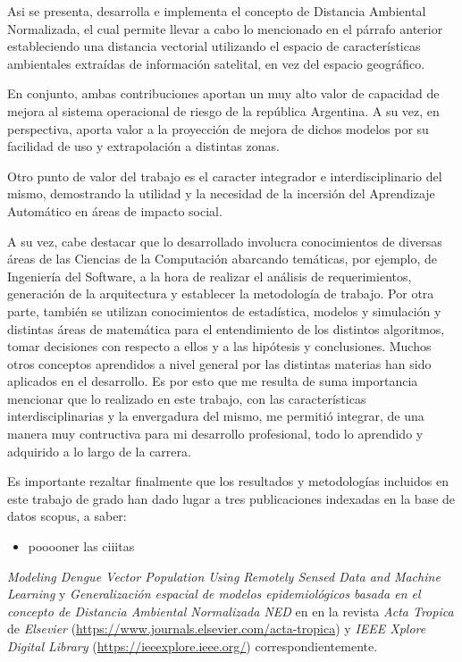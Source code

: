   \par Asi se presenta, desarrolla e implementa el concepto de Distancia Ambiental
    Normalizada, el cual permite
    llevar a cabo lo mencionado en el párrafo anterior estableciendo una distancia
    vectorial utilizando el espacio de características ambientales extraídas de
    información satelital, en vez del espacio geográfico.

  \par En conjunto, ambas contribuciones aportan un muy alto valor de capacidad de
    mejora al sistema operacional de riesgo de la república Argentina. A su vez,
    en perspectiva, aporta valor a la proyección de mejora de dichos modelos por
    su facilidad de uso y extrapolación a distintas zonas.

  \par Otro punto de valor del trabajo es el caracter integrador e
    interdisciplinario del mismo, demostrando la utilidad y la necesidad
    de la incersión del Aprendizaje Automático en áreas de impacto social.

  \par A su vez, cabe destacar que lo desarrollado involucra conocimientos de
  diversas áreas de las Ciencias de la Computación abarcando temáticas, por ejemplo, de
  Ingeniería del Software, a la hora de realizar el análisis de requerimientos,
  generación de la arquitectura y establecer la metodología de trabajo.
  Por otra parte, también se utilizan conocimientos de estadística, modelos y
  simulación y distintas áreas de matemática para el entendimiento de los
  distintos algoritmos, tomar decisiones con respecto a
  ellos y a las hipótesis y conclusiones. Muchos otros conceptos aprendidos
  a nivel general por las distintas materias han sido aplicados en el desarrollo.
  Es por esto que me resulta de suma importancia mencionar que lo realizado en
  este trabajo, con las características interdisciplinarias y la envergadura
  del mismo, me permitió integrar, de una manera muy contructiva para mi
  desarrollo profesional, todo lo aprendido y adquirido a lo largo de la carrera.

  \par Es importante rezaltar finalmente  que los resultados y metodologías incluidos en este
    trabajo de grado han dado lugar a tres publicaciones indexadas en la base de
    datos scopus, a saber:

    \begin{itemize}
      \item pooooner las ciiitas
    \end{itemize}
    \textit{Modeling Dengue Vector Population Using Remotely Sensed Data and
    Machine Learning} \cite{scavuzzo2018modeling} y
    \textit{Generalización espacial de modelos epidemiológicos basada en el
    concepto de Distancia Ambiental Normalizada NED} en
    en la revista \textit{Acta Tropica}
    de \textit{Elsevier} (\url{https://www.journals.elsevier.com/acta-tropica})
    y \textit{IEEE Xplore Digital Library} (\url{https://ieeexplore.ieee.org/})
    correspondientemente.

